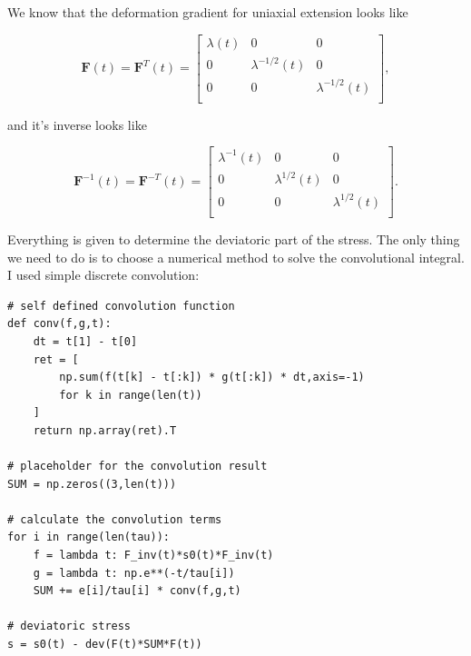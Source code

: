 \documentclass[12pt,a4paper]{article}
\begin{document}
We know that the deformation gradient for uniaxial extension looks like

\begin{equation}
\boldsymbol{F}(t) = \boldsymbol{F}^T(t) = 
\begin{bmatrix}
    \lambda(t) & 0 & 0\\
    0&\lambda^{-1/2}(t)&0\\
    0&0&\lambda^{-1/2}(t)\\
\end{bmatrix},
\end{equation}

and it's inverse looks like

\begin{equation}
\boldsymbol{F}^{-1}(t) =  \boldsymbol{F}^{-T}(t)=
\begin{bmatrix}
    \lambda^{-1}(t) & 0 & 0\\
    0&\lambda^{1/2}(t)&0\\
    0&0&\lambda^{1/2}(t)\\
\end{bmatrix}.
\end{equation}

Everything is given to determine the deviatoric part of the stress. The only thing we need to do is to choose a numerical method to solve the convolutional integral. I used simple discrete convolution:

\lstset{style=python}
\begin{lstlisting}
# self defined convolution function
def conv(f,g,t):
    dt = t[1] - t[0]
    ret = [
        np.sum(f(t[k] - t[:k]) * g(t[:k]) * dt,axis=-1) 
        for k in range(len(t))
    ]
    return np.array(ret).T

# placeholder for the convolution result
SUM = np.zeros((3,len(t)))

# calculate the convolution terms
for i in range(len(tau)):
    f = lambda t: F_inv(t)*s0(t)*F_inv(t)
    g = lambda t: np.e**(-t/tau[i])
    SUM += e[i]/tau[i] * conv(f,g,t)

# deviatoric stress
s = s0(t) - dev(F(t)*SUM*F(t))
\end{lstlisting}
\end{document}
